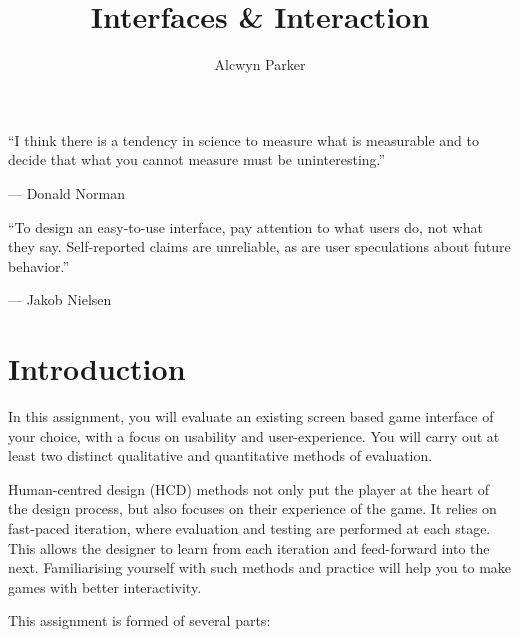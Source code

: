 \documentclass{../fal_assignment}
\title{Interfaces \& Interaction}
\author{Alcwyn Parker}
\begin{document}
\maketitle

\begin{marginquote}
    ``I think there is a tendency in science to measure what is measurable and to decide that what you cannot measure must be uninteresting.''
    
    --- Donald Norman
    
    \marginquoterule
    
    ``To design an easy-to-use interface, pay attention to what users do, not what they say. Self-reported claims are unreliable, as are user speculations about future behavior.''
    
    --- Jakob Nielsen
\end{marginquote}

\section*{Introduction}

In this assignment, you will evaluate an existing screen based game interface of your choice, with a focus on usability and user-experience. You will carry out at least two distinct qualitative and quantitative methods of evaluation.

Human-centred design (HCD) methods not only put the player at the heart of the design process, but also focuses on their experience of the game. It relies on fast-paced iteration, where evaluation and testing are performed at each stage. This allows the designer to learn from each iteration and feed-forward into the next. Familiarising yourself with such methods and practice will help you to make games with better interactivity.  

This assignment is formed of several parts:
\end{document}
